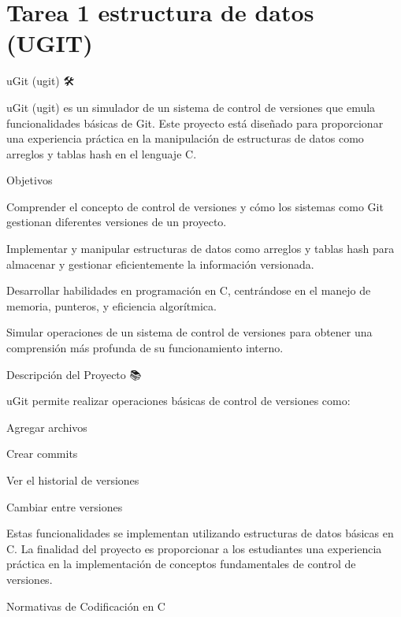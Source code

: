 \chapter{Tarea 1 estructura de datos (UGIT)}
\hypertarget{index}{}\label{index}
\label{index_md__r_e_a_d_m_e}%
%
 u\+Git (ugit) 🛠️

u\+Git (ugit) es un simulador de un sistema de control de versiones que emula funcionalidades básicas de Git. Este proyecto está diseñado para proporcionar una experiencia práctica en la manipulación de estructuras de datos como arreglos y tablas hash en el lenguaje C.

Objetivos 🎯


\begin{DoxyItemize}
\item Comprender el concepto de control de versiones y cómo los sistemas como Git gestionan diferentes versiones de un proyecto.
\item Implementar y manipular estructuras de datos como arreglos y tablas hash para almacenar y gestionar eficientemente la información versionada.
\item Desarrollar habilidades en programación en C, centrándose en el manejo de memoria, punteros, y eficiencia algorítmica.
\item Simular operaciones de un sistema de control de versiones para obtener una comprensión más profunda de su funcionamiento interno.
\end{DoxyItemize}

Descripción del Proyecto 📚

u\+Git permite realizar operaciones básicas de control de versiones como\+:
\begin{DoxyItemize}
\item Agregar archivos
\item Crear commits
\item Ver el historial de versiones
\item Cambiar entre versiones
\end{DoxyItemize}

Estas funcionalidades se implementan utilizando estructuras de datos básicas en C. La finalidad del proyecto es proporcionar a los estudiantes una experiencia práctica en la implementación de conceptos fundamentales de control de versiones.

Normativas de Codificación en C 🧩

